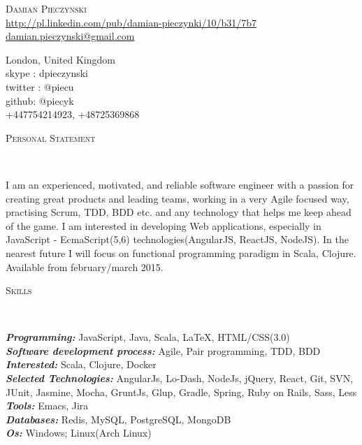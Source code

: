 \documentclass[9pt]{article}
\newenvironment{changemargin}[2]{%
  \begin{list}{}{%
      \setlength{\topsep}{0pt}%
      \setlength{\leftmargin}{#1}%
      \setlength{\rightmargin}{#2}%
      \setlength{\listparindent}{\parindent}%
      \setlength{\itemindent}{\parindent}%
      \setlength{\parsep}{\parskip}%
    }%
  \item[]}{\end{list}
}
\newcommand{\lineover}{
  \begin{changemargin}{-0.05in}{-0.05in}
    \vspace*{-8pt}
    \hrulefill \\
    \vspace*{-2pt}
  \end{changemargin}
}
\newcommand{\header}[1]{
	\begin{changemargin}{-0.5in}{-0.5in}
		\scshape{#1}\\
  	\lineover
	\end{changemargin}
}
\newcommand{\contact}[3]{
	\begin{changemargin}{-0.5in}{-0.5in}
		\begin{center}
			{\Large \scshape {#1}}\\ \smallskip
      {\url{#2}}\\ \smallskip
      {\href{mailto:#3}{#3}}\\ \smallskip
		\end{center}
	\end{changemargin}
}
\newenvironment{body} {
	\vspace*{-16pt}
	\begin{changemargin}{-0.25in}{-0.5in}
  }
	{\end{changemargin}
}
\begin{document}
\contact
    {Damian Pieczynski}
    {http://pl.linkedin.com/pub/damian-pieczynki/10/b31/7b7}
    {damian.pieczynski@gmail.com}
    {London, United Kingdom}\\
    {skype : dpieczynski}\\
    {twitter : @piecu}\\
    {github: @piecyk}\\
    {+447754214923, +48725369868}
    \medskip

\header{Personal Statement}
\begin{body}
  \vspace{14pt}
  I am an experienced, motivated, and reliable software engineer with a passion for creating great products and leading teams,
  working in a very Agile focused way, practising Scrum, TDD, BDD etc. and any technology that helps me keep ahead of the game.
  I am interested in developing Web applications, especially in JavaScript - EcmaScript(5,6) technologies(AngularJS, ReactJS, NodeJS).
  In the nearest future I will focus on functional programming paradigm in Scala, Clojure.
  Available from february/march 2015.
\end{body}
\medskip


\header{Skills}
\begin{body}
  \vspace{14pt}
  \emph{\textbf{Programming:}}{} JavaScript, Java, Scala, \LaTeX, HTML/CSS(3.0)\\
  \medskip
  \emph{\textbf{Software development process:}}{} Agile, Pair programming, TDD, BDD\\
  \medskip
  \emph{\textbf{Interested:}}{} Scala, Clojure, Docker\\
  \medskip
  \emph{\textbf{Selected Technologies:}}{} AngularJs, Lo-Dash, NodeJs, jQuery, React, Git, SVN, JUnit, Jasmine, Mocha, GruntJs, Glup, Gradle, Spring, Ruby on Rails, Sass, Less\\
  \medskip
  \emph{\textbf{Tools:}}{} Emacs, Jira\\
  \medskip
  \emph{\textbf{Databases:}}{} Redis, MySQL, PostgreSQL, MongoDB\\
  \medskip
  \emph{\textbf{Os:}}{} Windows; Linux(Arch Linux)\\
\end{body}
\medskip


\end{document}
